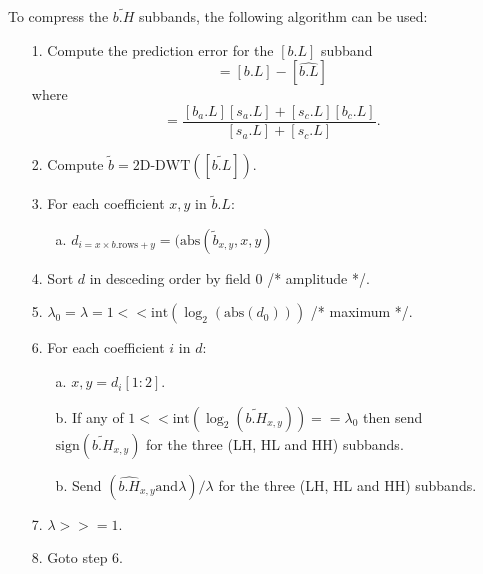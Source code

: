 To compress the $\tilde{b.H}$ subbands, the following algorithm can be
used:
\begin{enumerate}
\item [1.] Compute the prediction error for the $[b.L]$ subband
\begin{equation}
  [\tilde{b.L}] = [b.L] - [\hat{b.L}]
\end{equation}
where
\begin{equation}
  [\hat{b.L}] = \frac{[b_a.L][s_a.L]+[s_c.L][b_c.L]}{[s_a.L]+[s_c.L]}.
\end{equation}

\item [2.] Compute $\tilde{b}=\text{2D-DWT}([\tilde{b.L}])$.
\item [3.] For each coefficient $x,y$ in $\tilde{b}.L$:
  \begin{enumerate}
  \item [a.] $d_{i=x\times b.\text{rows}+y} = (\text{abs}(\tilde{b}_{x,y}, x, y)$
  \end{enumerate}
\item [4.] Sort $d$ in desceding order by field 0 /* amplitude */.
\item [5.] $\lambda_0 = \lambda = 1 <<
  \text{int}(\log_2(\text{abs}(d_{0})))$ /* maximum */.
\item [6.] For each coefficient $i$ in $d$:
  \begin{enumerate}
  \item [a.] $x,y = d_i[1:2]$.
  \item [b.] If any of
    $1<<\text{int}(\log_2(\tilde{b.H}_{x,y}))==\lambda_0$ then send
    $\text{sign}(\tilde{b.H}_{x,y})$ for the three (LH, HL and HH)
    subbands.
  \item [b.] Send $(\hat{b.H}_{x,y} \text{and} \lambda)/\lambda$ for
    the three (LH, HL and HH) subbands.
  \end{enumerate}
\item [7.] $\lambda >>= 1$.
\item [8.] Goto step 6.
\end{enumerate}


